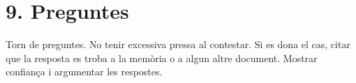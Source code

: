 \section*{9. Preguntes}
Torn de preguntes. No tenir excessiva pressa al contestar. Si es dona el cas, citar que la resposta es troba a la memòria o a algun altre document. Mostrar confiança i argumentar les respostes.





















\clearpage


